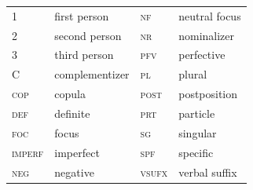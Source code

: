 \documentclass[output=paper,colorlinks,citecolor=brown,draftmode
]{langscibook}
\begin{document}
\begin{tabular}{llll} 
1 & first person  & \textsc{nf} & neutral focus \\ 
2 & second person & \textsc{nr} & nominalizer \\
3 & third person & \textsc{pfv} & perfective \\
C & complementizer & \textsc{pl} & plural \\
\textsc{cop}  & copula  & \textsc{post} & postposition \\
\textsc{def} & definite & \textsc{prt} & particle \\
\textsc{foc} & focus & \textsc{sg} & singular \\
\textsc{imperf} & imperfect & \textsc{spf} & specific \\
\textsc{neg} & negative & \textsc{vsufx} & verbal suffix \\
\end{tabular}


\sloppy 
\printbibliography[heading=subbibliography,notkeyword=this]
\end{document}
